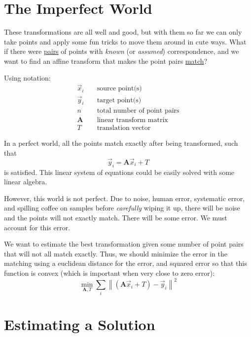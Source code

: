 \section{The Imperfect World}

These transformations are all well and good, but with them so far we can only take points and apply some fun tricks to move them around in cute ways. What if there were \underline{pairs} of points with \emph{known} (or \emph{assumed}) correspondence, and we want to find an affine transform that makes the point pairs \underline{match}?

Using notation:
\begin{align}
\vec{x}_i &\; &\text{source point(s)}\\
\vec{y}_i & &\text{target point(s)}\\
n && \text{total number of point pairs}\\
\mathbf{\mathbf{A}}& & \text{linear transform matrix}\\
T & &\text{translation vector}
\end{align}

In a perfect world, all the points match exactly after being transformed, such that 
\begin{equation}
\vec{y}_i = \mathbf{A} \vec{x}_i +T
\end{equation}
is satisfied. This linear system of equations could be easily solved with some linear algebra.

However, this world is not perfect. Due to noise, human error, systematic error, and spilling coffee on samples before \emph{carefully} wiping it up, there will be noise and the points will not exactly match. There will be some error. We must account for this error.

We want to estimate the best transformation given some number of point pairs that will not all match exactly. Thus, we should minimize the error in the matching using a euclidean distance for the error, and squared error so that this function is convex (which is important when very close to zero error):
\begin{equation}
\underset{\mathbf{A},T}{\min}\sum_i\left\|(\mathbf{A}\vec{x}_i + T) - \vec{y}_i\right\|^2
\end{equation}

\section{Estimating a Solution}

